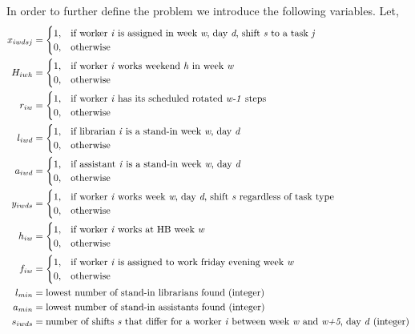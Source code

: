 In order to further define the problem we introduce the following variables. Let,
\begin{align}
    x_{iwdsj}&=
    \begin{cases}
      1, & \text{if worker \textit{i} is assigned in week \textit{w}, day \textit{d}, shift \textit{s} to a task \textit{j}}\\
      0, & \text{otherwise}
    \end{cases}
    \\
    H_{iwh}&=
    \begin{cases}
      1, & \text{if worker \textit{i} works weekend \textit{h} in week \textit{w}}\\
      0, & \text{otherwise}
    \end{cases}
	\\
	r_{iw}&=
	\begin{cases}
		1, & \text{if worker \textit{i} has its scheduled rotated \textit{w-1} steps}\\
		0, & \text{otherwise}
	\end{cases}
	\\
	l_{iwd}&=
	\begin{cases}
	  1, & \text{if librarian \textit{i} is a stand-in week \textit{w}, day \textit{d}} \\
	  0, & \text{otherwise}
	\end{cases}
	\\
	a_{iwd}&=
	\begin{cases}
 		1, & \text{if assistant \textit{i} is a stand-in week \textit{w}, day \textit{d}} \\
 		0, & \text{otherwise}
	\end{cases}
	\\
	y_{iwds}&=
	\begin{cases}
 		1, & \text{if worker \textit{i} works week \textit{w}, day \textit{d}, shift \textit{s} regardless of task type} \\
 		0, & \text{otherwise}
	\end{cases}
	\\
	h_{iw}&=
	\begin{cases}
 		1, & \text{if worker \textit{i} works at HB week \textit{w}} \\
 		0, & \text{otherwise}
	\end{cases}
	\\
	f_{iw}&=
	\begin{cases}
 		1, & \text{if worker \textit{i} is assigned to work friday evening week \textit{w}} \\
 		0, & \text{otherwise}
	\end{cases}	
	\\
	l_{min}&= \text{lowest number of stand-in librarians found (integer)} \\
	a_{min}&= \text{lowest number of stand-in assistants found (integer)} \\
	s_{iwds}&= \text{number of shifts \textit{s} that differ for a worker \textit{i} between week \textit{w} and \textit{w+5}, day \textit{d} (integer)}
\end{align}

